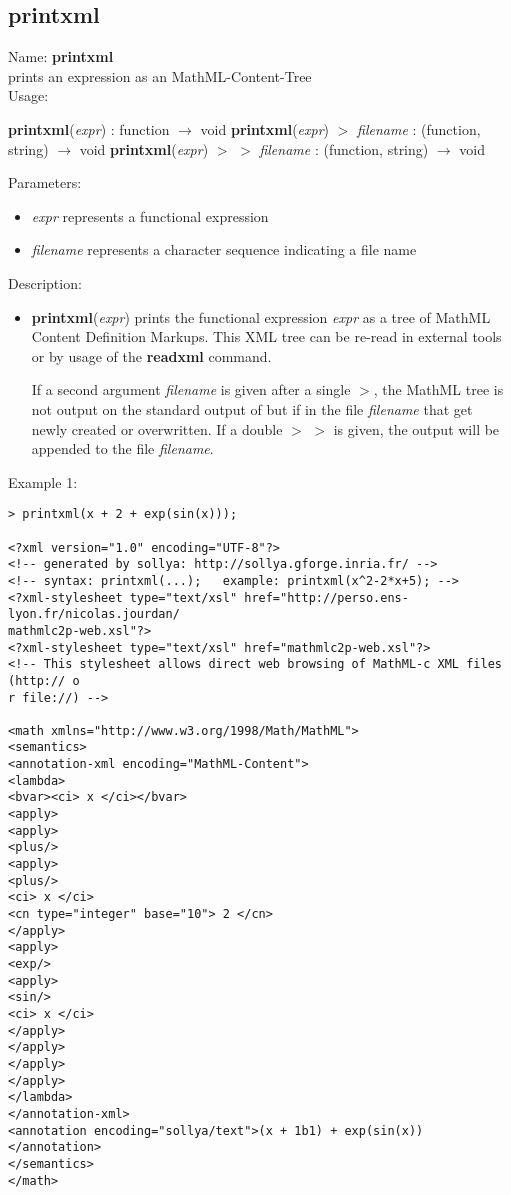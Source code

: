 \subsection{printxml}
\label{labprintxml}
\noindent Name: \textbf{printxml}\\
prints an expression as an MathML-Content-Tree\\
\noindent Usage: 
\begin{center}
\textbf{printxml}(\emph{expr}) : \textsf{function} $\rightarrow$ \textsf{void}
\textbf{printxml}(\emph{expr}) $>$ \emph{filename} : (\textsf{function}, \textsf{string}) $\rightarrow$ \textsf{void}
\textbf{printxml}(\emph{expr}) $>$ $>$ \emph{filename} : (\textsf{function}, \textsf{string}) $\rightarrow$ \textsf{void}
\end{center}
Parameters: 
\begin{itemize}
\item \emph{expr} represents a functional expression
\item \emph{filename} represents a character sequence indicating a file name
\end{itemize}
\noindent Description: \begin{itemize}

\item \textbf{printxml}(\emph{expr}) prints the functional expression \emph{expr} as a tree of
   MathML Content Definition Markups. This XML tree can be re-read in
   external tools or by usage of the \textbf{readxml} command.
    
   If a second argument \emph{filename} is given after a single $>$, the
   MathML tree is not output on the standard output of \sollya but if in
   the file \emph{filename} that get newly created or overwritten. If a double
   $>$ $>$ is given, the output will be appended to the file \emph{filename}.
\end{itemize}
\noindent Example 1: 
\begin{center}\begin{minipage}{15cm}\begin{Verbatim}[frame=single]
> printxml(x + 2 + exp(sin(x)));

<?xml version="1.0" encoding="UTF-8"?>
<!-- generated by sollya: http://sollya.gforge.inria.fr/ -->
<!-- syntax: printxml(...);   example: printxml(x^2-2*x+5); -->
<?xml-stylesheet type="text/xsl" href="http://perso.ens-lyon.fr/nicolas.jourdan/
mathmlc2p-web.xsl"?>
<?xml-stylesheet type="text/xsl" href="mathmlc2p-web.xsl"?>
<!-- This stylesheet allows direct web browsing of MathML-c XML files (http:// o
r file://) -->

<math xmlns="http://www.w3.org/1998/Math/MathML">
<semantics>
<annotation-xml encoding="MathML-Content">
<lambda>
<bvar><ci> x </ci></bvar>
<apply>
<apply>
<plus/>
<apply>
<plus/>
<ci> x </ci>
<cn type="integer" base="10"> 2 </cn>
</apply>
<apply>
<exp/>
<apply>
<sin/>
<ci> x </ci>
</apply>
</apply>
</apply>
</apply>
</lambda>
</annotation-xml>
<annotation encoding="sollya/text">(x + 1b1) + exp(sin(x))</annotation>
</semantics>
</math>

\end{Verbatim}
\end{minipage}\end{center}

